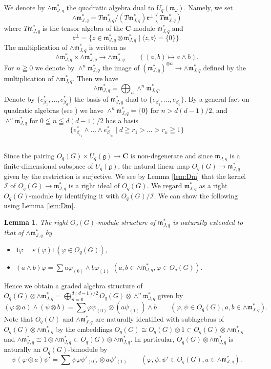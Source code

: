 \documentclass[a4paper, 12pt, leqno]{amsart}
\newtheorem{lemma}{{\sc Lemma}}[section]
\theoremstyle{definition}
\numberwithin{equation}{section}
\def\Gg{{\mathfrak{g}}}
\def\Gm{{\mathfrak{m}}}
\def\Gr{{\mathfrak{r}}}
\def\BC{{\mathbf{C}}}
\def\SI{{\mathscr I}}
\def\m{\Gm_{J,q}}
\begin{document}
We denote by $\wedge\m^*$ the quadratic algebra dual to $U_q(\Gm_J)$.
Namely, we set
\[
\wedge\m^*=T\m^*/(T\m^*)\Gr^\perp (T\m^*)
\]
where $T\m^*$ is the tensor algebra of the $\BC$-module $\m^*$ and 
\[
\Gr^\perp=\{
z\in\m^*\otimes\m^*\mid \langle z,\Gr\rangle=\{0\}\}.
\]
The multiplication of $\wedge\m^*$ is written as 
\[
\wedge\m^*\times \wedge\m^*\to \wedge\m^*
\qquad((a,b)\mapsto a\wedge b).
\]
For $n\geqq0$ we denote by $\wedge^n\m^*$ the image of $(\m^*)^{\otimes n}\to \wedge\m^*$ defined by the multiplication of $\wedge\m^*$.
Then we have 
\[
\wedge\m^*=\bigoplus_n\wedge^n\m^*.
\]
Denote by $\{e^*_{\beta_1},\dots, e^*_{\beta_d}\}$ the basis of $\m^*$ dual to $\{e_{\beta_1},\dots, e_{\beta_d}\}$.
By a general fact on quadratic algebras (see \cite[Theorem 4.1]{PP}) we have 
$\wedge^n\m^*=\{0\}$ for $n>d(d-1)/2$, and 
$\wedge^n\m^*$ for $0\leqq n\leqq d(d-1)/2$ has a basis
\[
\{e^*_{\beta_{r_1}}\wedge\dots\wedge e^*_{\beta_{r_n}}\mid
d\geqq r_1>\dots>r_n\geqq 1\}
\]
\subsection{}
Since the pairing $O_q(G)\times U_q(\Gg)\to\BC$ is non-degenerate and since $\m$ is a finite-dimensional subspace of $U_q(\Gg)$, the natural linear map $O_q(G)\to\m^*$ given by the restriction is surjective.
We see by Lemma \ref{lem:Dm} that the kernel $\SI$ of $O_q(G)\to\m^*$ is a right ideal of $O_q(G)$.
We regard $\m^*$ as a right $O_q(G)$-module by identifying it with $O_q(G)/\SI$.
We can show the following using Lemma \ref{lem:Dm}.


\begin{lemma}
\label{lem:mO}
The right $O_q(G)$-module structure of $\m^*$ is naturally extended to that of $\wedge\m^*$ by
\begin{itemize}
\item[(a)]
$1\varphi=\varepsilon(\varphi)1$\quad$(\varphi\in O_q(G))$,
\item[(b)]
$(a\wedge b)\varphi=\sum a\varphi_{(0)}\wedge b\varphi_{(1)}$
\quad
$(a, b\in\wedge\m^*, \varphi\in O_q(G))$.

\end{itemize}
\end{lemma}
Hence we obtain a graded algebra structure of $O_q(G)\otimes \wedge\m^*=\bigoplus_{n=0}^{d(d-1)/2} O_q(G)\otimes \wedge^n\m^*$ given by
\begin{equation}
(\varphi\otimes a)\wedge(\psi\otimes b)
=
\sum \varphi\psi_{(0)}\otimes (a\psi_{(1)})\wedge b
\qquad(\varphi, \psi\in O_q(G), a, b\in\wedge\m^*).
\end{equation}
Note that $O_q(G)$ and $\wedge\m^*$ are naturally identified with sublagebras of $O_q(G)\otimes \wedge\m^*$ by the embeddings
$O_q(G)\cong O_q(G)\otimes 1\subset O_q(G)\otimes \wedge\m^*$ and 
$\wedge\m^*\cong1\otimes \wedge\m^*\subset O_q(G)\otimes \wedge\m^*$.
In particular, $O_q(G)\otimes \wedge\m^*$ is naturally an $O_q(G)$-bimodule by 
\begin{equation}
\psi(\varphi\otimes a)\psi'
=\sum\psi\varphi\psi'_{(0)}\otimes a\psi'_{(1)}
\qquad(\varphi, \psi, \psi'\in O_q(G), a\in\wedge\m^*).
\end{equation}
\end{document}
